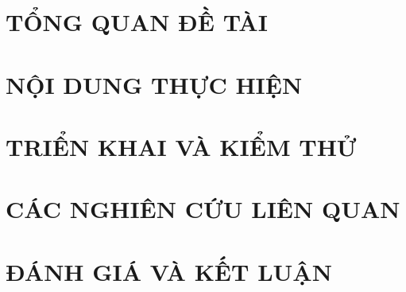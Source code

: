 \documentclass[12pt, a4paper]{report}
\begin{document}


\pagestyle{empty}

\tableofcontents
\clearpage
\setcounter{page}{1}
\pagestyle{customfancy}

\begingroup
\renewcommand*{\addvspace}[1]{}
{}
\listoffigures
\clearpage

{}
\listoftables
\clearpage


\clearpage

{}
\lstlistoflistings
\clearpage
\endgroup

\setcounter{page}{1}

\chapter{TỔNG QUAN ĐỀ TÀI}
\label{c:tongquan}


\chapter{NỘI DUNG THỰC HIỆN}
\label{c:noidung}


\chapter{TRIỂN KHAI VÀ KIỂM THỬ}
\label{c:trienkhai}


\chapter{CÁC NGHIÊN CỨU LIÊN QUAN}
\label{c:lienquan}


\chapter{ĐÁNH GIÁ VÀ KẾT LUẬN}
\label{c:danhgia}

\clearpage
\end{document}

